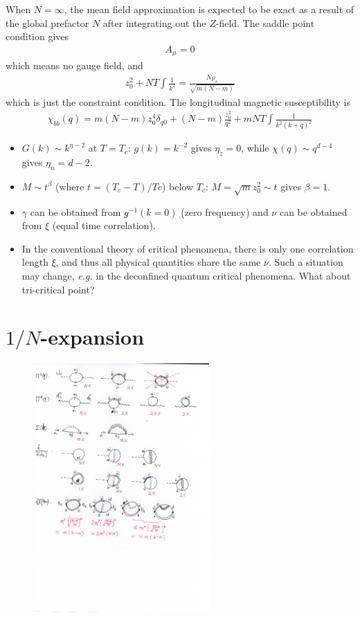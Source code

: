 \documentclass[aps,notitlepage]{revtex4-1}
\newcommand{\bea}{\begin{eqnarray}}
\newcommand{\eea}{\end{eqnarray}}
\begin{document}
When $N=\infty$, the mean field approximation is expected to be exact as a result of the global prefactor $N$ after integrating out the $Z$-field. The saddle point condition gives 
\bea A_\mu=0 \eea which means no gauge field, and 
\bea z_0^2 + NT\int \frac{1}{k^2} = \frac{N\rho_s}{\sqrt{m(N-m)}} \eea
which is just the constraint condition.
The longitudinal magnetic susceptibility is
\bea \chi_{bb}(q)= m(N-m) z_0^4\delta_{q0} + (N-m)\frac{z_0^2}{q^2} + mNT\int \frac{1}{k^2(k+q)^2} \eea




\begin{itemize}
	\item $G(k)\sim k^{\eta-2}$ at $T=T_c$: $g(k)=k^{-2}$ gives $\eta_z=0$, while $\chi(q)\sim q^{d-4}$ gives $\eta_n=d-2$.
	\item $M\sim t^\beta$ (where $t=(T_c-T)/Tc$) below $T_c$: $M=\sqrt{m}z_0^2\sim t$ gives $\beta=1$.
  \item $\gamma$ can be obtained from $g^{-1}(k=0)$ (zero frequency) and $\nu$ can be obtained from $\xi$ (equal time correlation).
  \item In the conventional theory of critical phenomena, there is only one correlation length $\xi$, and thus all physical quantities share the same $\nu$. Such a situation may change, \textit{e.g.} in the deconfined quantum critical phenomena. What about tri-critical point?
\end{itemize}

\section{$1/N$-expansion}

\begin{figure}
	\includegraphics[width=0.6\textwidth]{1-N.png}
\end{figure}
\end{document}
